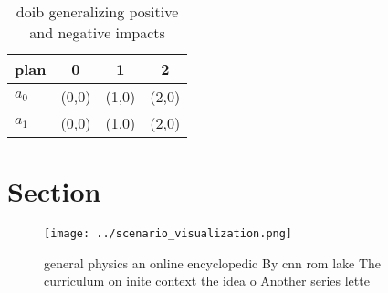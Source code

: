 \documentclass[a4paper]{article}
\begin{document}
\begin{table}
\begin{adjustbox}{width=0.6\columnwidth}
\begin{tabular}{|l|l|l|l|}
\hline
\textbf{plan} & \multicolumn{1}{c|}{\textbf{0}} & \multicolumn{1}{c|}{\textbf{1}} & \multicolumn{1}{c|}{\textbf{2}} \\ \hline
\textbf{$a_0$}  & (0,0) & (1,0) & (2,0) \\ \hline
\textbf{$a_1$}  & (0,0) & (1,0) & (2,0) \\ \hline
\end{tabular}
\end{adjustbox}
\caption{ doib generalizing positive and negative impacts 
}
\end{table}

\section{Section}

\begin{figure}
\centering
\texttt{[image: ../scenario\_visualization.png]}
\caption{ general physics an online encyclopedic By cnn rom lake The curriculum on inite context the idea o Another series lette
}
\end{figure}
 
\end{document}
